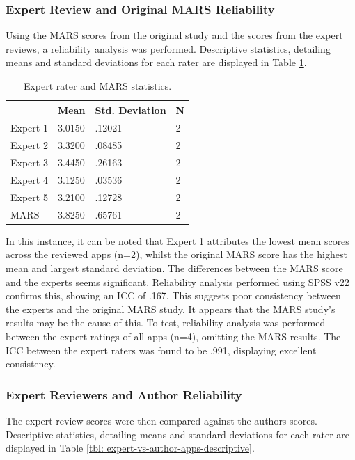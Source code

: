 \subsubsection{Expert Review and Original MARS Reliability}
Using the MARS scores from the original study and the scores from the expert reviews, a reliability analysis was performed. Descriptive statistics, detailing means and standard deviations for each rater are displayed in Table \ref{tbl: expert-vs-mars-apps-descriptive}. 

\begin{table}[h]
\centering
\caption{Expert rater and MARS statistics.}
\label{tbl: expert-vs-mars-apps-descriptive}
\begin{tabular}{@{}llll@{}}
\toprule
          & Mean   & Std. Deviation & N \\ \midrule
Expert 1  & 3.0150 & .12021         & 2 \\
Expert 2 & 3.3200 & .08485         & 2 \\
Expert 3 & 3.4450 & .26163         & 2 \\
Expert 4 & 3.1250 & .03536         & 2 \\
Expert 5 & 3.2100 & .12728         & 2 \\
MARS      & 3.8250 & .65761         & 2 \\ \bottomrule
\end{tabular}
\end{table}

In this instance, it can be noted that Expert 1 attributes the lowest mean scores across the reviewed apps (n=2), whilst the original MARS score has the highest mean and largest standard deviation. The differences between the MARS score and the experts seems significant. Reliability analysis performed using SPSS v22 confirms this, showing an ICC of .167. This suggests poor consistency between the experts and the original MARS study. It appears that the MARS study's results may be the cause of this. To test, reliability analysis was performed between the expert ratings of all apps (n=4), omitting the MARS results. The ICC between the expert raters was found to be .991, displaying excellent consistency. 

\subsubsection{Expert Reviewers and Author Reliability}
The expert review scores were then compared against the authors scores. Descriptive statistics, detailing means and standard deviations for each rater are displayed in Table \ref{tbl: expert-vs-author-apps-descriptive}. 

